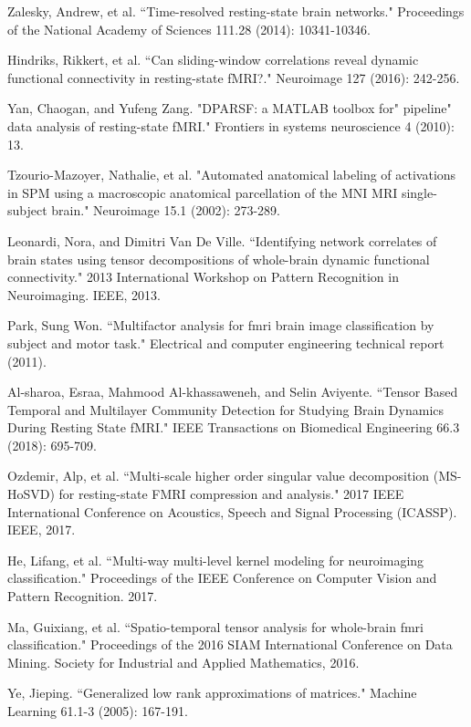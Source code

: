 \begin{thebibliography}{1}
	Zalesky, Andrew, et al. ``Time-resolved resting-state brain networks." Proceedings of the National Academy of Sciences 111.28 (2014): 10341-10346.
	
	Hindriks, Rikkert, et al. ``Can sliding-window correlations reveal dynamic functional connectivity in resting-state fMRI?." Neuroimage 127 (2016): 242-256.
		
	
	Yan, Chaogan, and Yufeng Zang. "DPARSF: a MATLAB toolbox for" pipeline" data analysis of resting-state fMRI." Frontiers in systems neuroscience 4 (2010): 13.
	
	
	Tzourio-Mazoyer, Nathalie, et al. "Automated anatomical labeling of activations in SPM using a macroscopic anatomical parcellation of the MNI MRI single-subject brain." Neuroimage 15.1 (2002): 273-289.
	
		
	Leonardi, Nora, and Dimitri Van De Ville. ``Identifying network correlates of brain states using tensor decompositions of whole-brain dynamic functional connectivity." 2013 International Workshop on Pattern Recognition in Neuroimaging. IEEE, 2013.
	
	 Park, Sung Won. ``Multifactor analysis for fmri brain image classification by subject and motor task." Electrical and computer engineering technical report (2011).
	
	
	Al-sharoa, Esraa, Mahmood Al-khassaweneh, and Selin Aviyente. ``Tensor Based Temporal and Multilayer Community Detection for Studying Brain Dynamics During Resting State fMRI." IEEE Transactions on Biomedical Engineering 66.3 (2018): 695-709.
	
	Ozdemir, Alp, et al. ``Multi-scale higher order singular value decomposition (MS-HoSVD) for resting-state FMRI compression and analysis." 2017 IEEE International Conference on Acoustics, Speech and Signal Processing (ICASSP). IEEE, 2017.
	
	 He, Lifang, et al. ``Multi-way multi-level kernel modeling for neuroimaging classification." Proceedings of the IEEE Conference on Computer Vision and Pattern Recognition. 2017.
	
	 Ma, Guixiang, et al. ``Spatio-temporal tensor analysis for whole-brain fmri classification." Proceedings of the 2016 SIAM International Conference on Data Mining. Society for Industrial and Applied Mathematics, 2016.
	
	
	Ye, Jieping. ``Generalized low rank approximations of matrices." Machine Learning 61.1-3 (2005): 167-191.
	

\end{thebibliography}
